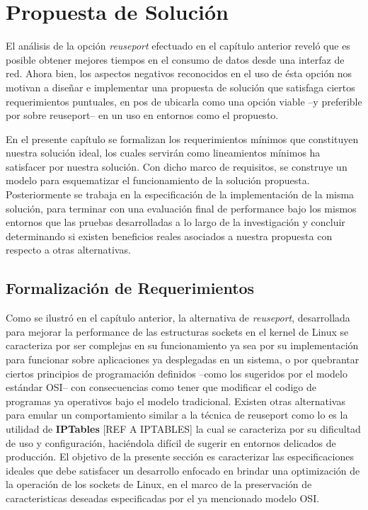 \chapter{Propuesta de Solución}
El análisis de la opción \emph{reuseport} efectuado en el capítulo anterior reveló que es posible obtener mejores tiempos en el consumo de datos desde una interfaz de red. Ahora bien, los aspectos negativos reconocidos en el uso de ésta opción nos motivan a diseñar e implementar una propuesta de solución que satisfaga ciertos requerimientos puntuales, en pos de ubicarla como una opción viable --y preferible por sobre reuseport-- en un uso en entornos como el propuesto.

En el presente capítulo se formalizan los requerimientos mínimos que constituyen nuestra solución ideal, los cuales servirán como lineamientos mínimos ha satisfacer por nuestra solución. Con dicho marco de requisitos, se construye un modelo para esquematizar el funcionamiento de la solución propuesta. Posteriormente se trabaja en la especificación de la implementación de la misma solución, para terminar con una evaluación final de performance bajo los mismos entornos que las pruebas desarrolladas a lo largo de la investigación y concluir determinando si existen beneficios reales asociados a nuestra propuesta con respecto a otras alternativas.

\section{Formalización de Requerimientos}
Como se ilustró en el capítulo anterior, la alternativa de \emph{reuseport}, desarrollada para mejorar la performance de las estructuras sockets en el kernel de Linux se caracteriza por ser complejas en su funcionamiento ya sea por su implementación para funcionar sobre aplicaciones ya desplegadas en un sistema, o por quebrantar ciertos principios de programación definidos --como los sugeridos por el modelo estándar OSI-- con consecuencias como tener que modificar el codigo de programas ya operativos bajo el modelo tradicional. Existen otras alternativas para emular un comportamiento similar a la técnica de reuseport como lo es la utilidad de \textbf{IPTables} [REF A IPTABLES] la cual se caracteriza por su dificultad de uso y configuración, haciéndola difícil de sugerir en entornos delicados de producción. El objetivo de la presente sección es caracterizar las especificaciones ideales que debe satisfacer un desarrollo enfocado en brindar una optimización de la operación de los sockets de Linux, en el marco de la preservación de caracteristicas deseadas especificadas por el ya mencionado modelo OSI.

